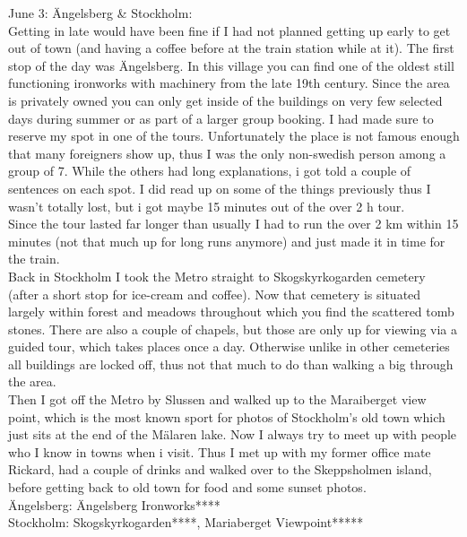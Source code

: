 June 3: \"Angelsberg \& Stockholm:\\
Getting in late would have been fine if I had not planned getting up early to get out of town (and having a coffee before at the train station while at it). The first stop of the day was \"Angelsberg. In this village you can find one of the oldest still functioning ironworks with machinery from the late 19th century. Since the area is privately owned you can only get inside of the buildings on very few selected days during summer or as part of a larger group booking. I had made sure to reserve my spot in one of the tours. Unfortunately the place is not famous enough that many foreigners show up, thus I was the only non-swedish person among a group of 7. While the others had long explanations, i got told a couple of sentences on each spot. I did read up on some of the things previously thus I wasn't totally lost, but i got maybe 15 minutes out of the over 2 h tour.\\
Since the tour lasted far longer than usually I had to run the over 2 km within 15 minutes (not that much up for long runs anymore) and just made it in time for the train.\\
Back in Stockholm I took the Metro straight to Skogskyrkogarden cemetery (after a short stop for ice-cream and coffee). Now that cemetery is situated largely within forest and meadows throughout which you find the scattered tomb stones. There are also a couple of chapels, but those are only up for viewing via a guided tour, which takes places once a day. Otherwise unlike in other cemeteries all buildings are locked off, thus not that much to do than walking a big through the area.\\ 
Then I got off the Metro by Slussen and walked up to the Maraiberget view point, which is the most known sport for photos of Stockholm's old town which just sits at the end of the M\"alaren lake. Now I always try to meet up with people who I know in towns when i visit. Thus I met up with my former office mate Rickard, had a couple of drinks and walked over to the Skeppsholmen island, before getting back to old town for food and some sunset photos.\\

\"Angelsberg: \"Angelsberg Ironworks****\\
Stockholm: Skogskyrkogarden****, Mariaberget Viewpoint*****\\

